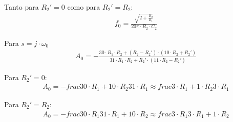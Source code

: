 Tanto para $R_2' = 0$ como para $R_2' = R_2$:
\begin{align}
    &f_0 = \frac{\sqrt{2 + \frac{R_2}{R_1}}}{20 \pi \cdot R_2 \cdot C_2}
\end{align}

Para $s = j \cdot \omega_0$
\begin{align}
    &A_0 = - \frac{30 \cdot R_1 \cdot R_2 + \left(R_2 - R_2'\right) \cdot \left(10 \cdot R_2 + R_2'\right)}{31 \cdot R_1 \cdot R_2 + R_2' \cdot \left(11 \cdot R_2 - R_2'\right)}
\end{align}

Para $R_2' = 0$:
\begin{align}
    &A_0 = - frac{30 \cdot R_1 + 10 \cdot R_2}{31 \cdot R_1} \approx frac{3 \cdot R_1 + 1 \cdot R_2}{3 \cdot R_1}
\end{align}

Para $R_2' = R_2$:
\begin{align}
    &A_0 = - frac{30 \cdot R_1}{31 \cdot R_1 + 10 \cdot R_2} \approx frac{3 \cdot R_1}{3 \cdot R_1 + 1 \cdot R_2}
\end{align}